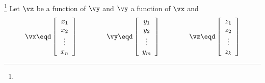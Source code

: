 \begin{theorem}
\label{thm:mc_chain_rule}
\footnote{
  }
Let $\vz$ be a function of $\vy$ and $\vy$ a function of $\vx$ and
\[
   \vx \eqd
   \left[\begin{array}{c}
     x_1    \\
     x_2    \\
     \vdots \\
     x_n
   \end{array}\right]
   \qquad\qquad
   \vy \eqd
   \left[\begin{array}{c}
     y_1    \\
     y_2    \\
     \vdots \\
     y_m
   \end{array}\right]
   \qquad\qquad
   \vz \eqd
   \left[\begin{array}{c}
     z_1    \\
     z_2    \\
     \vdots \\
     z_k
   \end{array}\right]
\]
\thmbox{
  \pderiv{}{\vx}\vz = \pderiv{\vy}{\vx} \pderiv{\vz}{\vy}           
  }
\end{theorem}
